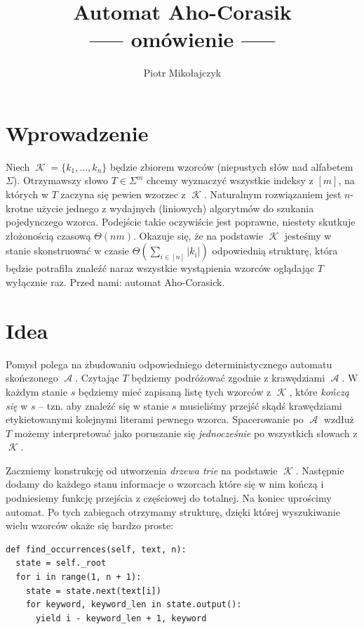 \documentclass{article}
\title{Automat Aho-Corasik\\\large{----- omówienie -----}}
\author{Piotr Mikołajczyk}
\date{}
\DeclareMathOperator{\K}{\mathcal{K}}
\DeclareMathOperator{\A}{\mathcal{A}}
\begin{document}
\maketitle

% 
% 
% 
% 
% 

\section{Wprowadzenie}

Niech $\K=\{k_1,...,k_n\}$ będzie zbiorem wzorców (niepustych słów nad alfabetem $\Sigma$). Otrzymawszy słowo $T\in\Sigma^m$ chcemy wyznaczyć wszystkie indeksy z $[m]$, na których w $T$ zaczyna się pewien wzorzec z $\K$. Naturalnym rozwiązaniem jest $n$-krotne użycie jednego z wydajnych (liniowych) algorytmów do szukania pojedynczego wzorca. Podejście takie oczywiście jest poprawne, niestety skutkuje złożonością czasową $\Theta(nm)$. Okazuje się, że na podstawie $\K$ jesteśmy w stanie skonstruować w czasie $\Theta(\sum_{i\in[n]}|k_i|)$ odpowiednią strukturę, która będzie potrafiła znaleźć naraz wszystkie wystąpienia wzorców oglądając $T$ wyłącznie raz. Przed nami: automat Aho-Corasick.

\section{Idea}

Pomysł polega na zbudowaniu odpowiedniego deterministycznego automatu skończonego $\A$. Czytając $T$ będziemy podróżować zgodnie z krawędziami $\A$. W każdym stanie $s$ będziemy mieć zapisaną listę tych wzorców z $\K$, które \textit{kończą się} w $s$ -- tzn. aby znaleźć się w stanie $s$ musieliśmy przejść skądś krawędziami etykietowanymi kolejnymi literami pewnego wzorca. Spacerowanie po $\A$ wzdłuż $T$ możemy interpretować jako poruszanie się \textit{jednocześnie} po wszystkich słowach z $\K$.

Zaczniemy konstrukcję od utworzenia \textit{drzewa trie} na podstawie $\K$. Następnie dodamy do każdego stanu informacje o wzorcach które się w nim kończą i podniesiemy funkcję przejścia z częściowej do totalnej. Na koniec uprościmy automat. Po tych zabiegach otrzymamy strukturę, dzięki której wyszukiwanie wielu wzorców okaże się bardzo proste:

\begin{verbatim}
def find_occurrences(self, text, n):
  state = self._root
  for i in range(1, n + 1):
    state = state.next(text[i])
    for keyword, keyword_len in state.output():
      yield i - keyword_len + 1, keyword
\end{verbatim}
\end{document}
